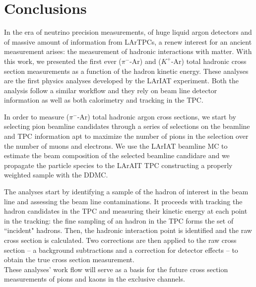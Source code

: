 \chapter{Conclusions}\label{ch:Conclusions}
In the era of neutrino precision measurements, of huge liquid argon detectors and of massive amount of information from LArTPCs, a renew interest for an ancient measurement arises: the measurement of hadronic interactions with matter. With this work, we presented the first ever ($\pi^-$-Ar) and ($K^+$-Ar) total hadronic cross section measurements as a function of the hadron kinetic energy. These analyses are the first physics analyses developed by the LArIAT experiment.
Both the analysis follow a similar workflow and  they rely on beam line detector information as well as both calorimetry and tracking in the TPC. 






In order to measure ($\pi^-$-Ar) total hadronic  argon cross sections, we start by selecting pion beamline candidates through a series of selections on the beamline and TPC information apt to maximize the number of pions in the selection over the number of muons and electrons. We use the LArIAT beamline MC to estimate the beam composition of the selected beamline candidare and we propagate the particle species to the LArAIT TPC constructing a properly weighted sample with the DDMC.


 The analyses start by identifying a sample of the hadron of interest in the beam line and assessing the beam line contaminations. It proceeds with tracking the hadron candidates in the TPC and measuring their kinetic energy at each point in the tracking: the fine sampling of an hadron in the TPC forms the set of ``incident" hadrons.  Then, the hadronic interaction point is identified and the raw cross section is calculated. Two corrections are then applied to the raw cross section -- a background subtractions and a correction for detector effects -- to obtain the true cross section measurement.\\



These analyses' work flow will serve as a basis for the future cross section measurements of pions and kaons in the exclusive channels.
